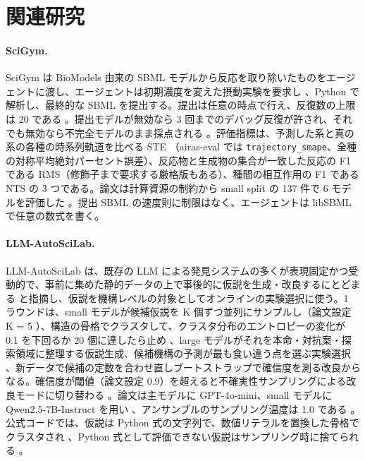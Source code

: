 \documentclass{article}
\begin{document}
\section{関連研究}
\label{sec:related}
\paragraph{SciGym.}
SciGym \citep{duan-2025-measuring} は BioModels 由来の SBML モデルから反応を取り除いたものをエージェントに渡し、エージェントは初期濃度を変えた摂動実験を要求し \cite[s1.p4]{duan-2025-measuring}、Python で解析し、最終的な SBML を提出する。提出は任意の時点で行え、反復数の上限は 20 である \cite[s1.p1]{duan-2025-measuring}。提出モデルが無効なら 3 回までのデバッグ反復が許され、それでも無効なら不完全モデルのまま採点される \cite[s1.p2]{duan-2025-measuring}。評価指標は、予測した系と真の系の各種の時系列軌道を比べる STE \cite[s1.p5]{duan-2025-measuring}（airas-eval では \texttt{trajectory\_smape}、全種の対称平均絶対パーセント誤差）、反応物と生成物の集合が一致した反応の F1 である RMS（修飾子まで要求する厳格版もある）\cite[s1.p6]{duan-2025-measuring}、種間の相互作用の F1 である NTS \cite[s1.p7]{duan-2025-measuring} の 3 つである。論文は計算資源の制約から small split の 137 件で 6 モデルを評価した \cite[s1.p9]{duan-2025-measuring}。提出 SBML の速度則に制限はなく、エージェントは libSBML で任意の数式を書く。

\paragraph{LLM-AutoSciLab.}
LLM-AutoSciLab \citep{kabra-2026-llm} は、既存の LLM による発見システムの多くが表現固定かつ受動的で、事前に集めた静的データの上で事後的に仮説を生成・改良するにとどまる \cite[s2.p3]{kabra-2026-llm} と指摘し、仮説を機構レベルの対象としてオンラインの実験選択に使う。1 ラウンドは、small モデルが候補仮説を K 個ずつ並列にサンプルし（論文設定 K = 5 \cite[s2.p9]{kabra-2026-llm}）、構造の骨格でクラスタして、クラスタ分布のエントロピーの変化が 0.1 を下回るか 20 個に達したら止め \cite[s2.p10]{kabra-2026-llm}、large モデルがそれを本命・対抗案・探索領域に整理する仮説生成、候補機構の予測が最も食い違う点を選ぶ実験選択 \cite[s2.p6]{kabra-2026-llm}、新データで候補の定数を合わせ直しブートストラップで確信度を測る改良からなる。確信度が閾値（論文設定 0.9）を超えると不確実性サンプリングによる改良モードに切り替わる \cite[s2.p12]{kabra-2026-llm}。論文は主モデルに GPT-4o-mini、small モデルに Qwen2.5-7B-Instruct を用い \cite[s2.p4]{kabra-2026-llm}、アンサンブルのサンプリング温度は 1.0 である \cite[s2.p13]{kabra-2026-llm}。公式コードでは、仮説は Python 式の文字列で、数値リテラルを置換した骨格でクラスタされ \cite[s2.p28]{kabra-2026-llm}、Python 式として評価できない仮説はサンプリング時に捨てられる \cite[s2.p29]{kabra-2026-llm}。
\end{document}
